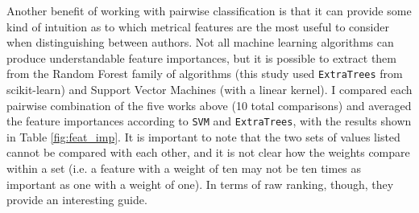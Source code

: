 \documentclass[11pt,a4paper]{scrartcl} %
\begin{document}
{Another benefit of working with pairwise classification is that it can provide some kind of intuition as to which metrical features are the most useful to consider when distinguishing between authors. Not all machine learning algorithms can produce understandable feature importances, but it is possible to extract them from the Random Forest family of algorithms (this study used \texttt{ExtraTrees} from scikit-learn) and Support Vector Machines (with a linear kernel). I compared each pairwise combination of the five works above (10 total comparisons) and averaged the feature importances according to \texttt{SVM} and \texttt{ExtraTrees}, with the results shown in Table \ref{fig:feat_imp}. It is important to note that the two sets of values listed cannot be compared with each other, and it is not clear how the weights compare within a set (i.e. a feature with a weight of ten may not be ten times as important as one with a weight of one). In terms of raw ranking, though, they provide an interesting guide. 
\begin{table}
\caption{Ranked Feature Importances, as determined by \texttt{ExtraTrees} and \texttt{SVM}}
\label{fig:feat_imp}
\phantom{x}
\centering
{}
\end{table}
}
\end{document}
